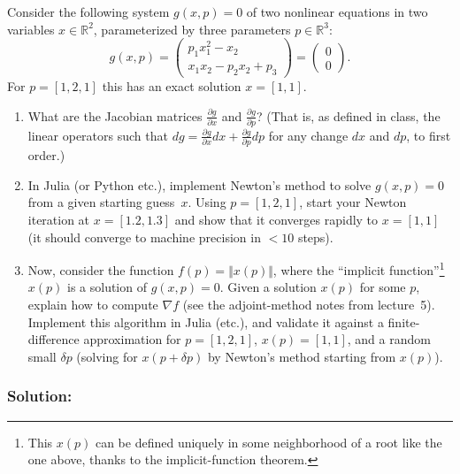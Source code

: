 \documentclass[10pt,oneside]{article}
\begin{document}
Consider the following system $g(x,p)=0$ of two nonlinear equations
in two variables $x\in\mathbb{R}^{2}$, parameterized by three parameters
$p\in\mathbb{R}^{3}$:
\[
g(x,p)=\left(\begin{array}{c}
p_{1}x_{1}^{2}-x_{2}\\
x_{1}x_{2}-p_{2}x_{2}+p_{3}
\end{array}\right)=\left(\begin{array}{c}
0\\
0
\end{array}\right).
\]
For $p=[1,2,1]$ this has an exact solution $x=[1,1]$.
\begin{enumerate}
\item What are the Jacobian matrices $\frac{\partial g}{\partial x}$ and
$\frac{\partial g}{\partial p}$? (That is, as defined in class, the
linear operators such that $dg=\frac{\partial g}{\partial x}dx+\frac{\partial g}{\partial p}dp$
for any change $dx$ and $dp$, to first order.)
\item In Julia (or Python etc.), implement Newton's method to solve $g(x,p)=0$
from a given starting guess~$x$. Using $p=[1,2,1]$, start your
Newton iteration at $x=[1.2,1.3]$ and show that it converges rapidly
to $x=[1,1]$ (it should converge to machine precision in $<10$ steps).
\item Now, consider the function $f(p)=\Vert x(p)\Vert$, where the ``implicit
function''\footnote{This $x(p)$ can be defined uniquely in some neighborhood of a root
like the one above, thanks to the implicit-function theorem.} $x(p)$ is a solution of $g(x,p)=0$. Given a solution $x(p)$ for
some $p$, explain how to compute $\nabla f$ (see the adjoint-method
notes from lecture~5). Implement this algorithm in Julia (etc.),
and validate it against a finite-difference approximation for $p=[1,2,1]$,
$x(p)=[1,1]$, and a random small $\delta p$ (solving for $x(p+\delta p)$
by Newton's method starting from $x(p)$).
\end{enumerate}

\subsubsection*{Solution:}
\end{document}
